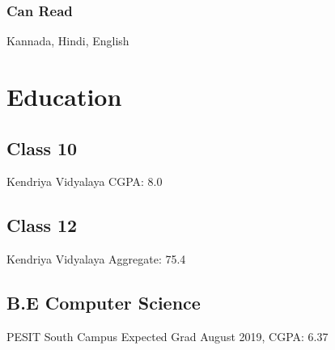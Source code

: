 \documentclass{article}
\begin{document}
\subsubsection{Can Read}
Kannada, Hindi, English

\section{Education}
\subsection{Class 10}
Kendriya Vidyalaya CGPA: 8.0

\subsection{Class 12}
Kendriya Vidyalaya Aggregate: 75.4

\subsection{B.E Computer Science}
PESIT South Campus Expected Grad August 2019, CGPA: 6.37
\end{document}
